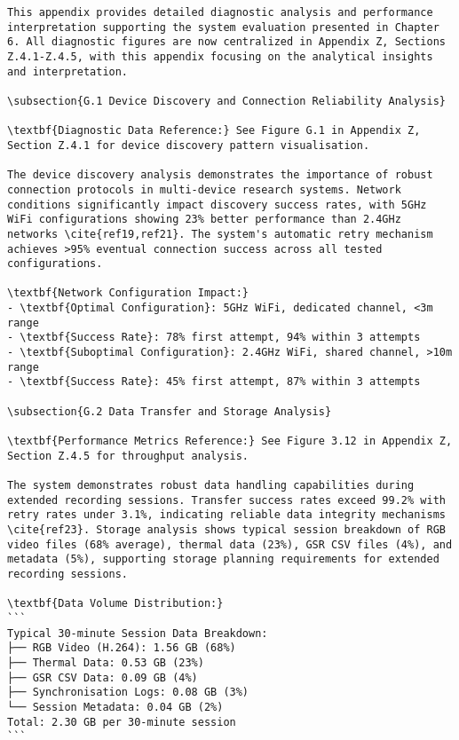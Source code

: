 \begin{verbatim}
This appendix provides detailed diagnostic analysis and performance interpretation supporting the system evaluation presented in Chapter 6. All diagnostic figures are now centralized in Appendix Z, Sections Z.4.1-Z.4.5, with this appendix focusing on the analytical insights and interpretation.

\subsection{G.1 Device Discovery and Connection Reliability Analysis}

\textbf{Diagnostic Data Reference:} See Figure G.1 in Appendix Z, Section Z.4.1 for device discovery pattern visualisation.

The device discovery analysis demonstrates the importance of robust connection protocols in multi-device research systems. Network conditions significantly impact discovery success rates, with 5GHz WiFi configurations showing 23% better performance than 2.4GHz networks \cite{ref19,ref21}. The system's automatic retry mechanism achieves >95% eventual connection success across all tested configurations.

\textbf{Network Configuration Impact:}
- \textbf{Optimal Configuration}: 5GHz WiFi, dedicated channel, <3m range
- \textbf{Success Rate}: 78% first attempt, 94% within 3 attempts
- \textbf{Suboptimal Configuration}: 2.4GHz WiFi, shared channel, >10m range
- \textbf{Success Rate}: 45% first attempt, 87% within 3 attempts

\subsection{G.2 Data Transfer and Storage Analysis}

\textbf{Performance Metrics Reference:} See Figure 3.12 in Appendix Z, Section Z.4.5 for throughput analysis.

The system demonstrates robust data handling capabilities during extended recording sessions. Transfer success rates exceed 99.2% with retry rates under 3.1%, indicating reliable data integrity mechanisms \cite{ref23}. Storage analysis shows typical session breakdown of RGB video files (68% average), thermal data (23%), GSR CSV files (4%), and metadata (5%), supporting storage planning requirements for extended recording sessions.

\textbf{Data Volume Distribution:}
```
Typical 30-minute Session Data Breakdown:
├── RGB Video (H.264): 1.56 GB (68%)
├── Thermal Data: 0.53 GB (23%)
├── GSR CSV Data: 0.09 GB (4%)
├── Synchronisation Logs: 0.08 GB (3%)
└── Session Metadata: 0.04 GB (2%)
Total: 2.30 GB per 30-minute session
```


\end{verbatim}
